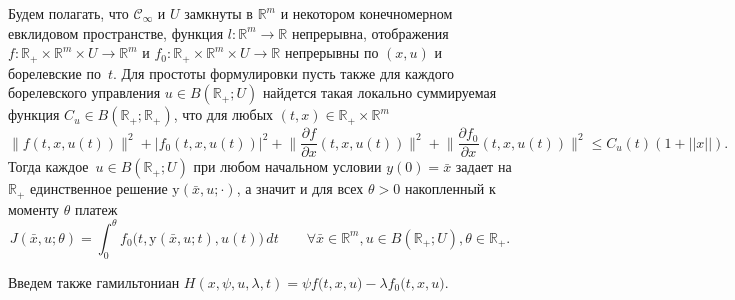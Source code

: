 Будем полагать, что $\mathcal{C}_\infty$ и $U$  замкнуты в $\mathbb{R}^m$ и некотором конечномерном евклидовом пространстве, функция $l:\mathbb{R}^m\to\mathbb{R}$ непрерывна, 
отображения  $f:\mathbb{R}_+\times\mathbb{R}^m\times U\to\mathbb{R}^m$ и
$f_0:\mathbb{R}_+\times\mathbb{R}^m\times U\to\mathbb{R}$
непрерывны по $(x,u)$ и борелевские по~$t$. 
Для простоты формулировки пусть также для каждого борелевского управления $u\in B(\mathbb{R}_+;U)$ найдется такая локально суммируемая функция $C_u\in B(\mathbb{R}_+;\mathbb{R}_+)$, что  для любых $(t,x)\in\mathbb{R}_+\times\mathbb{R}^m$ 
\[ \|f(t,x,u(t))\|^2+|f_0(t,x,u(t))|^2+\Big\|\frac{\partial f}{\partial x}(t,x,u(t))\Big\|^2+\Big\|\frac{\partial f_0}{\partial x}(t,x,u(t))\Big\|^2\leq C_u(t)(1+||x||).\]
Тогда каждое~$u\in B(\mathbb{R}_+;U)$  при любом начальном условии $y(0)=\bar{x}$ задает на $\mathbb{R}_+$ единственное  решение ${ \mathrm{y}}(\bar{x},u;\cdot)$, а значит и для всех $\theta>0$ накопленный к моменту $\theta$ платеж
\[      	J(\bar{x},u;\theta)=\int_{0}^{\theta} f_0\big(t,{ \mathrm{y}}(\bar{x},u;t),u(t)\big)\,dt\qquad\forall
\bar{x}\in\mathbb{R}^m,u\in B(\mathbb{R}_+;U),\theta\in\mathbb{R}_+. \]

Введем также
гамильтониан
$
H(x,\psi,u,\lambda,t)=\psi f\big(t,x,u\big)-\lambda
f_0\big(t,x,u\big).
$

